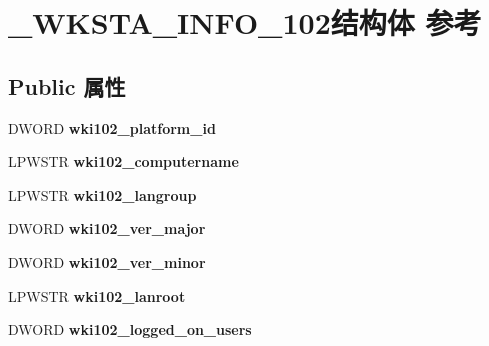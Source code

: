 \hypertarget{struct___w_k_s_t_a___i_n_f_o__102}{}\section{\+\_\+\+W\+K\+S\+T\+A\+\_\+\+I\+N\+F\+O\+\_\+102结构体 参考}
\label{struct___w_k_s_t_a___i_n_f_o__102}
\subsection*{Public 属性}
\begin{DoxyCompactItemize}
\item 
\mbox{\label{struct___w_k_s_t_a___i_n_f_o__102_ab46c42c972c9b8d5da72c1e615ea09f4}} 
D\+W\+O\+RD {\bfseries wki102\+\_\+platform\+\_\+id}
\item 
\mbox{\label{struct___w_k_s_t_a___i_n_f_o__102_ae1be2b436412985a29afda14d963210b}} 
L\+P\+W\+S\+TR {\bfseries wki102\+\_\+computername}
\item 
\mbox{\label{struct___w_k_s_t_a___i_n_f_o__102_a70e0360a2b03fa454dbfff2a516298e4}} 
L\+P\+W\+S\+TR {\bfseries wki102\+\_\+langroup}
\item 
\mbox{\label{struct___w_k_s_t_a___i_n_f_o__102_ade3354a064ec7c57e9a7a1c17df71448}} 
D\+W\+O\+RD {\bfseries wki102\+\_\+ver\+\_\+major}
\item 
\mbox{\label{struct___w_k_s_t_a___i_n_f_o__102_a1b24bcda26cb119b8490626d69ff43df}} 
D\+W\+O\+RD {\bfseries wki102\+\_\+ver\+\_\+minor}
\item 
\mbox{\label{struct___w_k_s_t_a___i_n_f_o__102_a0664abb512fec34f9c7e201b64947bcb}} 
L\+P\+W\+S\+TR {\bfseries wki102\+\_\+lanroot}
\item 
\mbox{\label{struct___w_k_s_t_a___i_n_f_o__102_a6b394b82bc273c8f849245ebd1df7035}} 
D\+W\+O\+RD {\bfseries wki102\+\_\+logged\+\_\+on\+\_\+users}
\item 
\mbox{\label{struct___w_k_s_t_a___i_n_f_o__102_af4bceb471e7f3812dc685f8b10bab597}} 

\end{DoxyCompactItemize}
